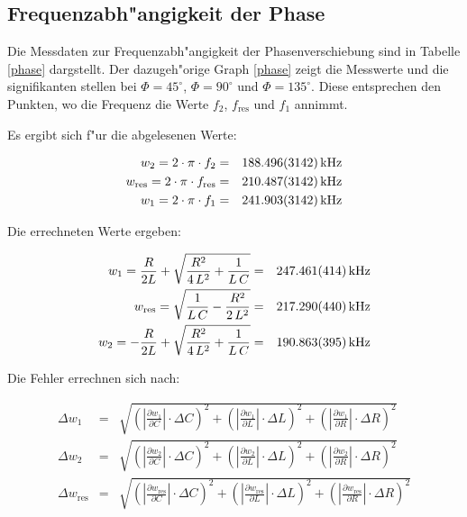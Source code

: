 	\newpage

	\subsection{Frequenzabh"angigkeit der Phase} %
	\label{sub:frequenzabh"angigkeit_der_phase}
	
	Die Messdaten zur Frequenzabh"angigkeit der Phasenverschiebung sind in Tabelle \eqref{phase} dargstellt.
	Der dazugeh"orige Graph \eqref{phase} zeigt die Messwerte und die signifikanten stellen bei $\Phi = 45^\circ$, $\Phi = 90^\circ$ und $\Phi = 135^\circ$.
	Diese entsprechen den Punkten, wo die Frequenz die Werte $f_2$, $f_\mathrm{res}$ und $f_1$ annimmt.

	Es ergibt sich f"ur die abgelesenen Werte:

	\begin{eqnarray*}
		w_2 = 2 \cdot \pi \cdot f_2 &=& \SI{188.496 (3142)}{\kilo \hertz}\\
		w_\mathrm{res} = 2 \cdot \pi \cdot f_\mathrm{res} &=& \SI{210.487 (3142)}{\kilo \hertz}\\
		w_1 = 2 \cdot \pi \cdot f_1 &=& \SI{241.903 (3142)}{\kilo \hertz}
	\end{eqnarray*}

	Die errechneten Werte ergeben:

	\begin{eqnarray*}
		w_1 = \frac{R}{2L} + \sqrt{\frac{R^2}{4\,L^2} + \frac{1}{L \, C}} &=& \SI{247.461 (414)}{\kilo \hertz}\\
		w_\mathrm{res} = \sqrt{\frac{1}{L\, C} - \frac{R^2}{2 \, L^2}} &=& \SI{217.290 (440)}{\kilo \hertz}\\
		w_2 = -\frac{R}{2L} + \sqrt{\frac{R^2}{4\,L^2} + \frac{1}{L \, C}} &=& \SI{190.863 (395)}{\kilo \hertz}
	\end{eqnarray*}

	Die Fehler errechnen sich nach:

	\begin{eqnarray*}
		\Delta w_1 &=& \sqrt{ \left( |\frac{\partial w_1}{\partial C}| \cdot \Delta C\right)^2 + \left( |\frac{\partial w_1}{\partial L}| \cdot \Delta L \right)^2 + \left( |\frac{\partial w_1}{\partial R}| \cdot \Delta R \right)^2}\\
		\Delta w_2 &=& \sqrt{ \left( |\frac{\partial w_2}{\partial C}| \cdot \Delta C\right)^2 + \left( |\frac{\partial w_2}{\partial L}| \cdot \Delta L \right)^2 + \left( |\frac{\partial w_2}{\partial R}| \cdot \Delta R \right)^2}\\
		\Delta w_\mathrm{res} &=& \sqrt{ \left( |\frac{\partial w_\mathrm{res}}{\partial C}| \cdot \Delta C\right)^2 + \left( |\frac{\partial w_\mathrm{res}}{\partial L}| \cdot \Delta L \right)^2 + \left( |\frac{\partial w_\mathrm{res}}{\partial R}| \cdot \Delta R \right)^2}
	\end{eqnarray*}

